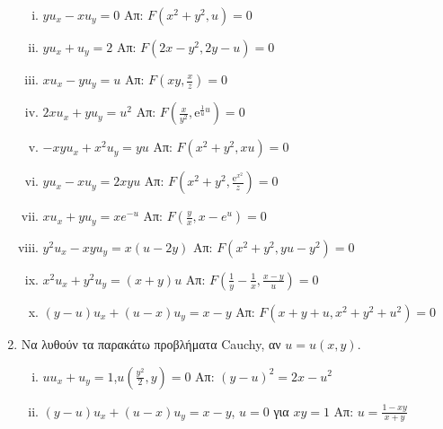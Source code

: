 \begin{enumerate}
    \begin{enumerate}[i)]
      \item $yu_{x}-xu_{y}=0$ \hfill Απ: $F(x^{2}+y^{2},u)=0$ 
      \item $yu_{x}+u_{y}=2$ \hfill Απ: $F(2x-y^{2},2y-u)=0$
      \item $ x u_{x}-yu_{y}=u $ \hfill Απ: $ F(xy, \frac{x}{z})=0 $
      \item $ 2x u_{x}+yu_{y}=u^{2} $ 
        \hfill Απ: $ F(\frac{x}{y^{2}},\mathrm{e}^{\frac{1}{u} u})=0 $ 
      \item $-xyu_{x}+x^{2}u_{y}=yu$ \hfill Απ: $F(x^{2}+y^{2},xu)=0$
      \item $ yu_{x}-xu_{y}=2xyu $ 
        \hfill Απ: $ F(x^{2}+y^{2}, \frac{\mathrm{e}^{x^{2}}}{z})=0 $  

      \item $xu_{x}+yu_{y}=xe^{-u}$ \hfill Απ: $F(\frac{y}{x},x-e^{u})=0$
      \item $y^{2}u_{x}-xyu_{y}=x(u-2y)$ \hfill Απ: $F(x^{2}+y^{2},yu-y^{2})=0$
      \item $x^{2}u_{x}+y^{2}u_{y}=(x+y)u$ 
        \hfill Απ: $F(\frac{1}{y}-\frac{1}{x},\frac{x-y}{u})=0$ 
      \item $(y-u)u_{x}+(u-x)u_{y}=x-y$ \hfill Απ: $F(x+y+u,x^{2}+y^{2}+u^{2})=0 $
    \end{enumerate}
  \item Να λυθούν τα παρακάτω προβλήματα Cauchy, αν $u=u(x,y)$.

    \begin{enumerate}[i)]
      \item $uu_{x}+u_{y}=1$,\quad $u(\frac{y^{2}}{2},y)=0$ 
        \hfill Απ: $(y-u)^{2}=2x-u^{2}$
      \item $ (y-u)u_{x}+(u-x)u_{y}=x-y $, \quad $ u=0 $ για $ xy=1 $
        \hfill Απ: $ u= \frac{1-xy}{x+y} $  


\end{enumerate}
\end{enumerate}
